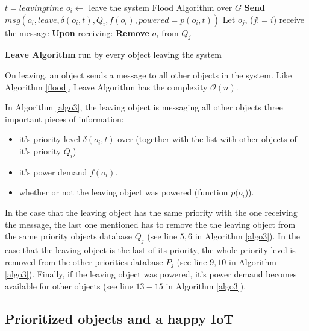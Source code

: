 \documentclass[../main/IoT.tex]{subfiles}
\begin{document}
\LinesNumbered
\IncMargin{1em}
\begin{algorithm}
$t = leaving time$
\BlankLine
$o_{i} \gets$ leave the system \newline
Flood Algorithm over $G$ \newline
\textbf{Send} $msg(o_{i}, leave,\delta(o_{i}, t), Q_{i}, f(o_{i}), powered=p(o_{i},t))$
\BlankLine
{} {
    Let $o_{j}$, ($j!=i$) receive the message
    \BlankLine
    \textbf{Upon} receiving:\newline
     {
          \textbf{Remove} $o_{i}$ from $Q_{j}$
    }
}
\caption{\textbf{Leave Algorithm} run by every object leaving the system} \label{algo3}
\end{algorithm}
\DecMargin{1em}
On leaving, an object sends a message to all other objects in the system. Like Algorithm \ref{flood}, Leave Algorithm has the complexity $\mathcal{O}(n)$.

In Algorithm \ref{algo3}, the leaving object is messaging all other objects three important pieces of information:
 \begin{itemize}
   \item it's priority level $\delta(o_{i}, t)$ over (together with the list with other objects of it's priority $Q_{i}$)
   \item it's power demand $f(o_{i})$.
   \item whether or not the leaving object was powered (function $p(o_{i}$)).
 \end{itemize}

In the case that the leaving object has the same priority with the one receiving the message, the last one mentioned has to remove the the leaving object from the same priority objects database $Q_{j}$ (see line $5, 6$ in Algorithm \ref{algo3}). In the case that the leaving object is the last of its priority, the whole priority level is removed from the other priorities database $P_{j}$ (see line $9, 10$ in Algorithm \ref{algo3}). Finally, if the leaving object was powered, it's power demand becomes available for other objects (see line $13-15$ in Algorithm \ref{algo3}).

\subsection{Prioritized objects and a happy IoT}
\end{document}
